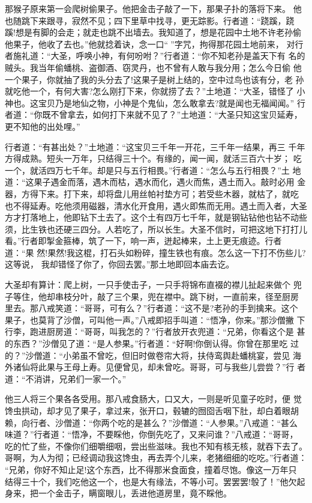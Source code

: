 那猴子原来第一会爬树偷果子。他把金击子敲了一下，那果子扑的落将下来。
他也随跳下来跟寻，寂然不见；四下里草中找寻，更无踪影。行者道：“跷蹊，跷
蹊!想是有脚的会走；就走也跳不出墙去。我知道了，想是花园中土地不许老孙偷
他果子，他收了去也。”他就捻着诀，念一口“”字咒，拘得那花园土地前来，
对行者施礼道：“大圣，呼唤小神，有何吩咐？”行者道：“你不知老孙是盖天下有
名的贼头。我当年偷蟠桃、盗御酒、窃灵丹，也不曾有人敢与我分用；怎么今日偷
他一个果子，你就抽了我的头分去了!这果子是树上结的，空中过鸟也该有分，老
孙就吃他一个，有何大害?怎么刚打下来，你就捞了去？”土地道：“大圣，错怪了
小神也。这宝贝乃是地仙之物，小神是个鬼仙，怎么敢拿去?就是闻也无福闻闻。”
行者道：“你既不曾拿去，如何打下来就不见了？”土地道：“大圣只知这宝贝延寿，
更不知他的出处哩。”

行者道：“有甚出处？”土地道：“这宝贝三千年一开花，三千年一结果，再三
千年方得成熟。短头一万年，只结得三十个。有缘的，闻一闻，就活三百六十岁；
吃一个，就活四万七千年。却是只与五行相畏。”行者道：“怎么与五行相畏？”土
地道：“这果子遇金而落，遇木而枯，遇水而化，遇火而焦，遇土而入。敲时必用
金器，方得下来。打下来，却将盘儿用丝帕衬垫方可；若受些木器，就枯了，就吃
也不得延寿。吃他须用磁器，清水化开食用，遇火即焦而无用。遇土而入者，大圣
方才打落地上，他即钻下土去了。这个土有四万七千年，就是钢钻钻他也钻不动些
须，比生铁也还硬三四分。人若吃了，所以长生。大圣不信时，可把这地下打打儿
看。”行者即掣金箍棒，筑了一下，响一声，迸起棒来，土上更无痕迹。行者道：“果
然!果然!我这棍，打石头如粉碎，撞生铁也有痕。怎么这一下打不伤些儿?这等说，
我却错怪了你了，你回去罢。”那土地即回本庙去讫。

大圣却有算计：爬上树，一只手使击子，一只手将锦布直裰的襟儿扯起来做个
兜子等住，他却串枝分叶，敲了三个果，兜在襟中。跳下树，一直前来，径至厨房
里去。那八戒笑道：“哥哥，可有么？”行者道：“这不是?老孙的手到擒来。这个
果子，也莫背了沙僧，可叫他一声。”八戒即招手叫道：“悟净，你来。”那沙僧撇
下行李，跑进厨房道：“哥哥，叫我怎的？”行者放开衣兜道：“兄弟，你看这个是
甚的东西？”沙僧见了道：“是人参果。”行者道：“好啊!你倒认得。你曾在那里吃
过的？”沙僧道：“小弟虽不曾吃，但旧时做卷帘大将，扶侍鸾舆赴蟠桃宴，尝见
海外诸仙将此果与王母上寿。见便曾见，却未曾吃。哥哥，可与我些儿尝尝？”行
者道：“不消讲，兄弟们一家一个。”

他三人将三个果各各受用。那八戒食肠大，口又大，一则是听见童子吃时，便
觉馋虫拱动，却才见了果子，拿过来，张开口，毂辘的囫囵舌咽下肚，却白着眼胡
赖，向行者、沙僧道：“你两个吃的是甚么？”沙僧道：“人参果。”八戒道：“甚么
味道？”行者道：“悟净，不要睬他，你倒先吃了，又来问谁？”八戒道：“哥哥，
吃的忙了些，不像你们细嚼细咽，尝出些滋味。我也不知有核无核，就吞下去了。
哥啊，为人为彻；已经调动我这馋虫，再去弄个儿来，老猪细细的吃吃。”行者道：
“兄弟，你好不知止足!这个东西，比不得那米食面食，撞着尽饱。像这一万年只
结得三十个，我们吃他这一个，也是大有缘法，不等小可。罢罢罢!彀了！”他欠起
身来，把一个金击子，瞒窗眼儿，丢进他道房里，竟不睬他。

